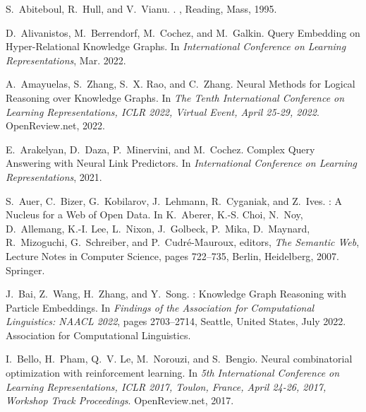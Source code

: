 \documentclass[11pt]{article}
\begin{document}
\begin{thebibliography}{10}
\itemsep=1pt
\begin{small}


S.~Abiteboul, R.~Hull, and V.~Vianu.
.
, {Reading, Mass}, 1995.

D.~Alivanistos, M.~Berrendorf, M.~Cochez, and M.~Galkin.
\newblock Query {{Embedding}} on {{Hyper-Relational Knowledge Graphs}}.
\newblock In {\em International {{Conference}} on {{Learning
  Representations}}}, Mar. 2022.

A.~Amayuelas, S.~Zhang, S.~X. Rao, and C.~Zhang.
\newblock Neural {{Methods}} for {{Logical Reasoning}} over {{Knowledge
  Graphs}}.
\newblock In {\em The {{Tenth International Conference}} on {{Learning
  Representations}}, {{ICLR}} 2022, {{Virtual Event}}, {{April}} 25-29, 2022}.
  {OpenReview.net}, 2022.

E.~Arakelyan, D.~Daza, P.~Minervini, and M.~Cochez.
\newblock Complex {{Query Answering}} with {{Neural Link Predictors}}.
\newblock In {\em International {{Conference}} on {{Learning
  Representations}}}, 2021.

S.~Auer, C.~Bizer, G.~Kobilarov, J.~Lehmann, R.~Cyganiak, and Z.~Ives.
: {{A Nucleus}} for a {{Web}} of {{Open Data}}.
\newblock In K.~Aberer, K.-S. Choi, N.~Noy, D.~Allemang, K.-I. Lee, L.~Nixon,
  J.~Golbeck, P.~Mika, D.~Maynard, R.~Mizoguchi, G.~Schreiber, and
  P.~{Cudr{\'e}-Mauroux}, editors, {\em The {{Semantic Web}}}, Lecture
  {{Notes}} in {{Computer Science}}, pages 722--735, {Berlin, Heidelberg},
  2007. {Springer}.

J.~Bai, Z.~Wang, H.~Zhang, and Y.~Song.
: {{Knowledge Graph Reasoning}} with {{Particle
  Embeddings}}.
\newblock In {\em Findings of the {{Association}} for {{Computational
  Linguistics}}: {{NAACL}} 2022}, pages 2703--2714, {Seattle, United States},
  July 2022. {Association for Computational Linguistics}.

I.~Bello, H.~Pham, Q.~V. Le, M.~Norouzi, and S.~Bengio.
\newblock Neural combinatorial optimization with reinforcement learning.
\newblock In {\em 5th International Conference on Learning Representations,
  {ICLR} 2017, Toulon, France, April 24-26, 2017, Workshop Track Proceedings}.
  OpenReview.net, 2017.


\end{small}
\end{thebibliography}
\end{document}
